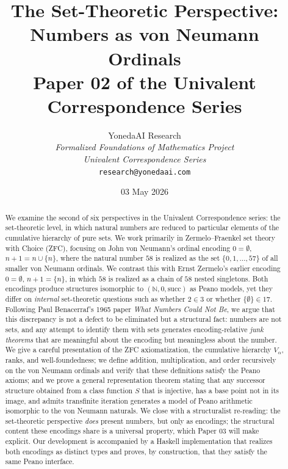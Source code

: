 \documentclass[12pt]{article}
\title{The Set-Theoretic Perspective: \\
Numbers as von Neumann Ordinals \\
\large Paper 02 of the Univalent Correspondence Series}
\author{YonedaAI Research \\
\textit{Formalized Foundations of Mathematics Project} \\
\textit{Univalent Correspondence Series} \\
\texttt{research@yonedaai.com}}
\date{03 May 2026}
\theoremstyle{definition}
\theoremstyle{remark}
\begin{document}
\maketitle

\begin{abstract}
We examine the second of six perspectives in the Univalent Correspondence series:
the set-theoretic level, in which natural numbers are reduced to particular
elements of the cumulative hierarchy of pure sets. We work primarily in
Zermelo--Fraenkel set theory with Choice (ZFC), focusing on John von Neumann's
ordinal encoding $0 = \emptyset$, $n+1 = n \cup \{n\}$, where the natural number
$58$ is realized as the set $\{0,1,\ldots,57\}$ of all smaller von Neumann
ordinals. We contrast this with Ernst Zermelo's earlier encoding
$0 = \emptyset$, $n+1 = \{n\}$, in which $58$ is realized as a chain of $58$
nested singletons. Both encodings produce structures isomorphic to
$(\mathbb{N},0,\mathrm{succ})$ as Peano models, yet they differ on
\emph{internal} set-theoretic questions such as whether $2 \in 3$ or whether
$\{\emptyset\} \in 17$. Following Paul Benacerraf's 1965 paper
\emph{What Numbers Could Not Be}, we argue that this discrepancy is not a
defect to be eliminated but a structural fact: numbers are not sets, and any
attempt to identify them with sets generates encoding-relative
\emph{junk theorems} that are meaningful about the encoding but meaningless
about the number. We give a careful presentation of the ZFC axiomatization,
the cumulative hierarchy $V_\alpha$, ranks, and well-foundedness; we define
addition, multiplication, and order recursively on the von Neumann ordinals
and verify that these definitions satisfy the Peano axioms; and we prove a
general representation theorem stating that any successor structure obtained
from a class function $S$ that is injective, has a base point not in its
image, and admits transfinite iteration generates a model of Peano arithmetic
isomorphic to the von Neumann naturals. We close with a structuralist
re-reading: the set-theoretic perspective \emph{does} present numbers, but
only as encodings; the structural content these encodings share is a
universal property, which Paper 03 will make explicit. Our development is
accompanied by a Haskell implementation that realizes both encodings as
distinct types and proves, by construction, that they satisfy the same Peano
interface.
\end{abstract}

\tableofcontents

\newpage
\end{document}
